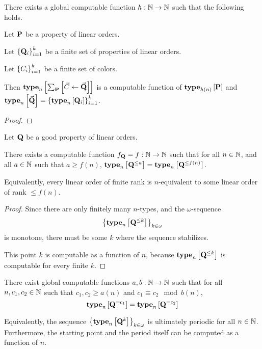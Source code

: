 \begin{lemma}
  There exists a global computable function
  $h : \mathbb{N} \to \mathbb{N}$ such that the following holds.

  Let $\mathbf{P}$ be a property of linear orders.

  Let $\left\{ {\mathbf{Q}_i} \right\}_{i=1}^k$ be a finite set of properties of linear orders.

  Let $\left\{ {C_i} \right\}_{i=1}^k$ be a finite set of colors.

  Then $\mathbf{type}_{n} \left[ {\sum_{\mathbf{P}} \left[ {{\vec{C}} \leftarrow {\vec{\mathbf{Q}}}} \right]} \right]$ is 
  a computable function of $\mathbf{type}_{h(n)} \left[ {\mathbf{P}} \right]$
  and $\mathbf{type}_{n} \left[ {\vec{\mathbf{Q}}} \right] = \left\{ {\mathbf{type}_{n} \left[ {\mathbf{Q}_i} \right]} \right\}_{i=1}^k$.
\end{lemma}

\begin{proof}
  
\end{proof}

\begin{lemma}\label{f-lemma}
  Let $\mathbf{Q}$ be a good property of linear orders.

  There exists a computable function $f_{\mathbf{Q}} = f: \mathbb{N} \to \mathbb{N}$ such that
  for all $n \in \mathbb{N}$, and all $a \in \mathbb{N}$ such that $a \ge f(n)$,
  $\mathbf{type}_{n} \left[ {\mathbf{Q}^{\le a}} \right] = \mathbf{type}_{n} \left[ {\mathbf{Q}^{\le f(n)}} \right]$.

  Equivalently, every linear order of finite rank is $n$-equivalent to some linear order of rank $\le f(n)$.
\end{lemma}

\begin{proof}
  Since there are only finitely many $n$-types,
  and the $\omega$-sequence \[\left\{ {\mathbf{type}_{n} \left[ {\mathbf{Q}^{\le k}} \right]} \right\}_{k \in \omega}\]
  is monotone,
  there must be some $k$ where the sequence stabilizes.

  This point $k$ is computable as a function of $n$, because
  $\mathbf{type}_{n} \left[ {\mathbf{Q}^{\le k}} \right]$ is computable for every finite $k$.
\end{proof}

\begin{lemma}\label{ab-lemma}
  There exist global computable functions $a, b : \mathbb{N} \to \mathbb{N}$ such that
  for all $n, c_1, c_2 \in \mathbb{N}$ such that $c_1, c_2 \ge a(n)$ and $c_1 \equiv c_2 \mod b(n)$,
  \[\mathbf{type}_{n} \left[ {\mathbf{Q}^{= c_1}} \right] = \mathbf{type}_{n} \left[ {\mathbf{Q}^{= c_2}} \right]\]

  Equivalently, the sequence $\left\{ {\mathbf{type}_{n} \left[ {\mathbf{Q}^{k}} \right]} \right\}_{k \in \omega}$
  is ultimately periodic for all $n \in \mathbb{N}$. Furthermore, the starting point and the period
  itself can be computed as a function of $n$.
\end{lemma}

